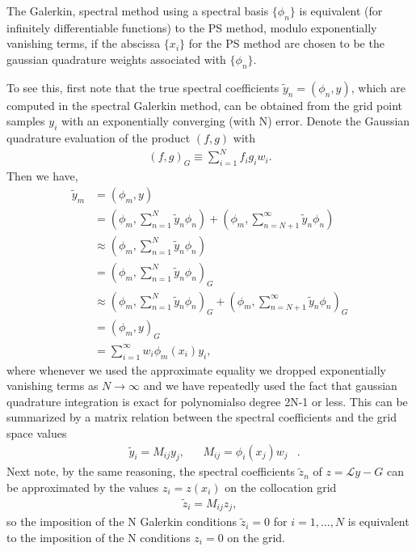 \documentclass[aps,prd,amsmath,showpacs,amssymb,superscriptaddress,nofootinbib,longbibliography,eqsecnum,preprintnumbers]{revtex4-1}
\newcommand{\zach}[1]{\textcolor{ForestGreen}{#1}}
\begin{document}
The Galerkin, spectral method using a spectral basis $\{\phi_n\}$ is equivalent (for infinitely differentiable functions) to the PS method, modulo exponentially vanishing terms, if the abscissa $\{x_i\}$ for the PS method are chosen to be the gaussian quadrature weights associated with $\{\phi_n\}$.

To see this, first note that the true spectral coefficients $\tilde y_n=(\phi_n,y)$, which are computed in the spectral Galerkin method, can be obtained from the grid point samples $y_i$ with an exponentially converging (with N) error. Denote the Gaussian quadrature evaluation of the product $(f,g)$ with
\begin{align}
(f,g)_G\equiv \sum_{i=1}^N f_ig_iw_i.
\end{align}
Then we have,
\begin{align}
\tilde y_m&=\left(\phi_m, y\right) \nonumber \\
&=\left(\phi_m, \sum_{n=1}^N\tilde y_n \phi_n\right) + \left(\phi_m, \sum_{n=N+1}^\infty\tilde y_n \phi_n\right) \nonumber \\
&\approx \left(\phi_m, \sum_{n=1}^N\tilde y_n \phi_n\right) \nonumber \\
&=\left(\phi_m, \sum_{n=1}^N\tilde y_n \phi_n\right)_G \nonumber \\
&\approx \left(\phi_m, \sum_{n=1}^N\tilde y_n \phi_n\right)_G +\left(\phi_m, \sum_{n=N+1}^\infty\tilde y_n \phi_n\right)_G \nonumber \\
&=\left(\phi_m, y\right)_G \nonumber \\
&=\sum_{i=1}^\infty w_i \phi_m(x_i)y_i,
\end{align}
where whenever we used the approximate equality we dropped exponentially vanishing terms as $N\to \infty$ and we have repeatedly used the fact that gaussian quadrature integration is exact for polynomialso degree 2N-1 or less. This can be summarized by a matrix relation between the spectral coefficients and the grid space values
\begin{align}
&\tilde y_i=M_{ij}y_j,& &M_{ij}=\phi_i(x_j)w_j&.
\end{align}
Next note, by the same reasoning, the spectral coefficients $\tilde z_n$ of $z=\mathcal L y-G$ can be approximated by the values $z_i=z(x_i)$ on the collocation grid
\begin{align}
\tilde z_i=M_{ij}z_j,
\end{align}
so the imposition of the N Galerkin conditions $\tilde z_i=0$ for $i=1,...,N$ is equivalent to the imposition of the N conditions $z_i=0$ on the grid. 
\end{document}
